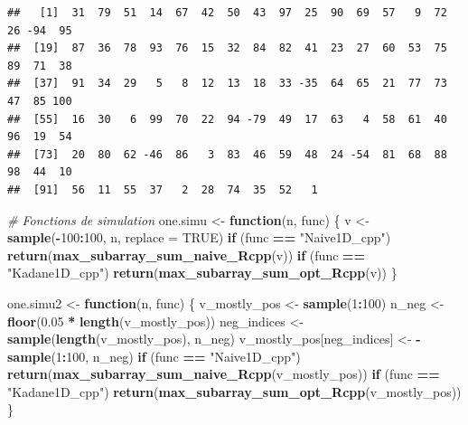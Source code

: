 \documentclass[
]{article}
\newenvironment{Shaded}{\begin{snugshade}}{\end{snugshade}}
\newcommand{\AttributeTok}[1]{\textcolor[rgb]{0.13,0.29,0.53}{#1}}
\newcommand{\CommentTok}[1]{\textcolor[rgb]{0.56,0.35,0.01}{\textit{#1}}}
\newcommand{\ConstantTok}[1]{\textcolor[rgb]{0.56,0.35,0.01}{#1}}
\newcommand{\ControlFlowTok}[1]{\textcolor[rgb]{0.13,0.29,0.53}{\textbf{#1}}}
\newcommand{\DecValTok}[1]{\textcolor[rgb]{0.00,0.00,0.81}{#1}}
\newcommand{\FloatTok}[1]{\textcolor[rgb]{0.00,0.00,0.81}{#1}}
\newcommand{\FunctionTok}[1]{\textcolor[rgb]{0.13,0.29,0.53}{\textbf{#1}}}
\newcommand{\NormalTok}[1]{#1}
\newcommand{\OtherTok}[1]{\textcolor[rgb]{0.56,0.35,0.01}{#1}}
\newcommand{\SpecialCharTok}[1]{\textcolor[rgb]{0.81,0.36,0.00}{\textbf{#1}}}
\newcommand{\StringTok}[1]{\textcolor[rgb]{0.31,0.60,0.02}{#1}}
\begin{document}
\begin{verbatim}
##   [1]  31  79  51  14  67  42  50  43  97  25  90  69  57   9  72  26 -94  95
##  [19]  87  36  78  93  76  15  32  84  82  41  23  27  60  53  75  89  71  38
##  [37]  91  34  29   5   8  12  13  18  33 -35  64  65  21  77  73  47  85 100
##  [55]  16  30   6  99  70  22  94 -79  49  17  63   4  58  61  40  96  19  54
##  [73]  20  80  62 -46  86   3  83  46  59  48  24 -54  81  68  88  98  44  10
##  [91]  56  11  55  37   2  28  74  35  52   1
\end{verbatim}

\begin{Shaded}
\begin{Highlighting}[]
\CommentTok{\# Fonctions de simulation}
\NormalTok{one.simu }\OtherTok{\textless{}{-}} \ControlFlowTok{function}\NormalTok{(n, func) \{}
\NormalTok{  v }\OtherTok{\textless{}{-}} \FunctionTok{sample}\NormalTok{(}\SpecialCharTok{{-}}\DecValTok{100}\SpecialCharTok{:}\DecValTok{100}\NormalTok{, n, }\AttributeTok{replace =} \ConstantTok{TRUE}\NormalTok{)}
  \ControlFlowTok{if}\NormalTok{ (func }\SpecialCharTok{==} \StringTok{"Naive1D\_cpp"}\NormalTok{) }\FunctionTok{return}\NormalTok{(}\FunctionTok{max\_subarray\_sum\_naive\_Rcpp}\NormalTok{(v))}
  \ControlFlowTok{if}\NormalTok{ (func }\SpecialCharTok{==} \StringTok{"Kadane1D\_cpp"}\NormalTok{) }\FunctionTok{return}\NormalTok{(}\FunctionTok{max\_subarray\_sum\_opt\_Rcpp}\NormalTok{(v))}
\NormalTok{\}}

\NormalTok{one.simu2 }\OtherTok{\textless{}{-}} \ControlFlowTok{function}\NormalTok{(n, func) \{}
\NormalTok{  v\_mostly\_pos }\OtherTok{\textless{}{-}} \FunctionTok{sample}\NormalTok{(}\DecValTok{1}\SpecialCharTok{:}\DecValTok{100}\NormalTok{)}
\NormalTok{  n\_neg }\OtherTok{\textless{}{-}} \FunctionTok{floor}\NormalTok{(}\FloatTok{0.05} \SpecialCharTok{*} \FunctionTok{length}\NormalTok{(v\_mostly\_pos))}
\NormalTok{  neg\_indices }\OtherTok{\textless{}{-}} \FunctionTok{sample}\NormalTok{(}\FunctionTok{length}\NormalTok{(v\_mostly\_pos), n\_neg)}
\NormalTok{  v\_mostly\_pos[neg\_indices] }\OtherTok{\textless{}{-}} \SpecialCharTok{{-}}\FunctionTok{sample}\NormalTok{(}\DecValTok{1}\SpecialCharTok{:}\DecValTok{100}\NormalTok{, n\_neg)}
  \ControlFlowTok{if}\NormalTok{ (func }\SpecialCharTok{==} \StringTok{"Naive1D\_cpp"}\NormalTok{) }\FunctionTok{return}\NormalTok{(}\FunctionTok{max\_subarray\_sum\_naive\_Rcpp}\NormalTok{(v\_mostly\_pos))}
  \ControlFlowTok{if}\NormalTok{ (func }\SpecialCharTok{==} \StringTok{"Kadane1D\_cpp"}\NormalTok{) }\FunctionTok{return}\NormalTok{(}\FunctionTok{max\_subarray\_sum\_opt\_Rcpp}\NormalTok{(v\_mostly\_pos))}
\NormalTok{\}}
\end{Highlighting}
\end{Shaded}
\end{document}
